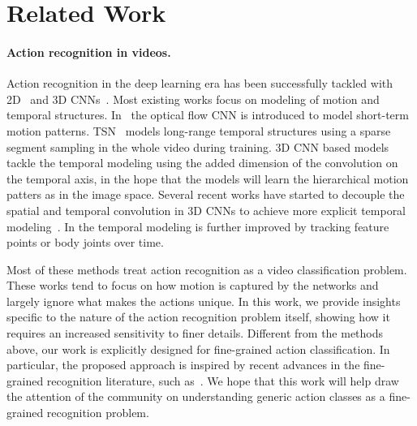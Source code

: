 \documentclass[10pt,twocolumn,letterpaper]{article}
\begin{document}
\section{Related Work}
\paragraph{Action recognition in videos.}
Action recognition in the deep learning era has been successfully tackled with 2D~\cite{TwoStream_NIPS14, TSN_TPAMI18} and 3D CNNs~\cite{Inflated3D_CVPR17,Multifiber_ECCV18,threeD_TPAMI13, Tran2015C3D, R2plus1d_CVPR18,NonLocalNN_CVPR18,S3D_G_ECCV18}. 
Most existing works focus on modeling of motion and temporal structures. 
In~\cite{TwoStream_NIPS14} the optical flow CNN is introduced to model short-term motion patterns. TSN~\cite{TSN_TPAMI18} models long-range temporal structures using a sparse segment sampling in the whole video during training. 3D CNN based models~\cite{Inflated3D_CVPR17,threeD_TPAMI13, Tran2015C3D,NonLocalNN_CVPR18} tackle the temporal modeling using the added dimension of the convolution on the temporal axis, in the hope that the models will learn the hierarchical motion patters as in the image space. Several recent works have started to decouple the spatial and temporal convolution in 3D CNNs to achieve more explicit temporal modeling~\cite{Multifiber_ECCV18,R2plus1d_CVPR18,S3D_G_ECCV18}. In \cite{Trajectory_NIPS18,Yan2018STGCN} the temporal modeling is further improved by tracking feature points or body joints over time. 

Most of these methods treat action recognition as a video classification problem. 
These works tend to focus on how motion is captured by the networks and largely ignore what makes the actions unique. 
In this work, we provide insights specific to the nature of the action recognition problem itself, showing how it requires an increased sensitivity to finer details. Different from the methods above, our work is explicitly designed for fine-grained action classification. In particular, the proposed approach is inspired by recent advances in the fine-grained recognition literature, such as~\cite{DiscriminativeFilterBank_CVPR18}. 
We hope that this work will help draw the attention of the community on understanding generic action classes as a fine-grained recognition problem.

\vspace{-2mm}
\end{document}
